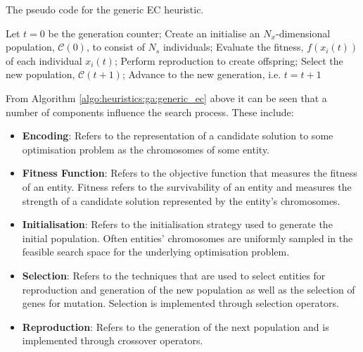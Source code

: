 \begin{algorithm}[H]
    \caption{The pseudo code for the generic \ac{EC} heuristic.}
    \label{algo:heuristics:ga:generic_ec}
    \begin{algorithmic}
        \State Let $t = 0$ be the generation counter;
        \State Create an initialise an $N_{x}$-dimensional population, $\mathcal{C}(0)$, to consist of $N_{s}$ individuals;
            \State Evaluate the fitness, $f(x_{i}(t))$ of each individual $x_{i}(t)$;
            \State Perform reproduction to create offspring;
            \State Select the new population, $\mathcal{C}(t+1)$;
            \State Advance to the new generation, i.e. $t = t + 1$
        \EndWhile
        \State
    \end{algorithmic}
\end{algorithm}

From Algorithm \ref{algo:heuristics:ga:generic_ec} above it can be seen that a number of components influence the search process. These include:

\begin{itemize}
    \item \textbf{Encoding}: Refers to the representation of a candidate solution to some optimisation problem as the chromosomes of some entity.
    
    \item \textbf{Fitness Function}: Refers to the objective function that measures the fitness of an entity. Fitness refers to the survivability of an entity and measures the strength of a candidate solution represented by the entity's chromosomes.
    
    \item \textbf{Initialisation}: Refers to the initialisation strategy used to generate the initial population. Often entities' chromosomes are uniformly sampled in the feasible search space for the underlying optimisation problem.
    
    \item \textbf{Selection}: Refers to the techniques that are used to select entities for reproduction and generation of the new population as well as the selection of genes for mutation. Selection is implemented through selection operators.
    
    \item \textbf{Reproduction}: Refers to the generation of the next population and is implemented through crossover operators.
\end{itemize}

